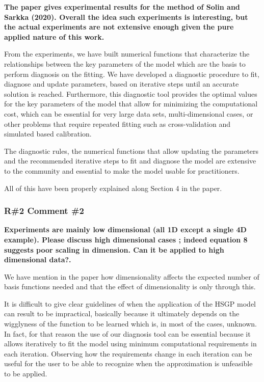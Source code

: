 \documentclass[11pt]{report}
\begin{document}
\textbf{The paper gives experimental results for the method of Solin and Sarkka  (2020). Overall the idea such experiments is interesting, but the actual experiments are not extensive enough given the pure applied nature of this work.}

From the experiments, we have built numerical functions that characterize the relationships between the key parameters of the model which are the basis to perform diagnosis on the fitting. We have developed a diagnostic procedure to fit, diagnose and update parameters, based on iterative steps until an accurate solution is reached. Furthermore, this diagnostic tool provides the optimal values for the key parameters of the model that allow for minimizing the computational cost, which can be essential for very large data sets, multi-dimensional cases, or other problems that require repeated fitting such as cross-validation and simulated based calibration.

The diagnostic rules, the numerical functions that allow updating the parameters and the recommended iterative steps to fit and diagnose the model are extensive to the community and essential to make the model usable for practitioners.

All of this have been properly explained along Section 4 in the paper.

\subsubsection*{R\#2 Comment \#2}

\textbf{Experiments are mainly low dimensional (all 1D except a single 4D example). Please discuss high dimensional cases ; indeed equation 8 suggests poor scaling in dimension. Can it be applied to high dimensional data?.} 

We have mention in the paper how dimensionality affects the expected number of basis functions needed and that the effect of dimensionality is only through this. 

It is difficult to give clear guidelines of when the application of the HSGP model can result to be impractical, basically because it ultimately depends on the wigglyness of the function to be learned which is, in most of the cases, unknown. In fact, for that reason the use of our diagnosis tool can be essential because it allows iteratively to fit the model using minimum computational requirements in each iteration. Observing how the requirements change in each iteration can be useful for the user to be able to recognize when the approximation is unfeasible to be applied.
\end{document}
